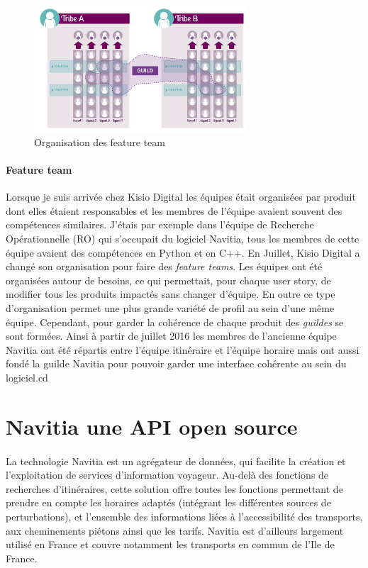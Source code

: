 \documentclass[a4paper]{report}
\begin{document}
\begin{figure}
		\includegraphics[width=8cm]{image/feature_team}
		\caption{Organisation des feature team}
		\label{Organisation des feature team}
\end{figure}

\paragraph {Feature team} Lorsque je suis arrivée chez Kisio Digital les équipes était organisées par produit dont elles étaient responsables et les membres de l'équipe avaient souvent des compétences similaires. J'étais par exemple dans l'équipe de Recherche Opérationnelle (RO) qui s'occupait du logiciel Navitia, tous les membres de cette équipe avaient des compétences en Python et en C++. En Juillet, Kisio Digital a changé son organisation pour faire des \emph{feature teams}. Les équipes ont été organisées autour de besoins, ce qui permettait, pour chaque user story, de modifier tous les produits impactés sans changer d'équipe. En outre ce type d'organisation permet une plus grande variété de profil au sein d'une même équipe. Cependant, pour garder la cohérence de chaque produit des \emph{guildes} se sont formées. Ainsi à partir de juillet 2016 les membres de l'ancienne équipe Navitia ont été répartis entre l'équipe itinéraire et l'équipe horaire mais ont aussi fondé la guilde Navitia pour pouvoir garder une interface cohérente au sein du logiciel.cd 

\section{Navitia une API open source}

\paragraph{}La technologie Navitia est un agrégateur de données, qui facilite la création et l’exploitation de services d’information voyageur. Au-delà des fonctions de recherches d’itinéraires, cette solution offre toutes les fonctions permettant de prendre en compte les horaires adaptés (intégrant les différentes sources de perturbations), et l’ensemble des informations liées à l’accessibilité des transports, aux cheminements piétons ainsi que les tarifs. Navitia est d’ailleurs largement utilisé en France et couvre notamment les transports en commun de l’Ile de France.  
\end{document}
